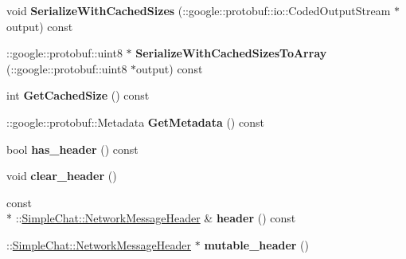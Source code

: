 \begin{DoxyCompactItemize}
\item 
\hypertarget{classSimpleChat_1_1NetworkMessage_ab6b3953b6b07078c18ea42f7c81ba957}{void {\bfseries Serialize\-With\-Cached\-Sizes} (\-::google\-::protobuf\-::io\-::\-Coded\-Output\-Stream $\ast$output) const }\label{classSimpleChat_1_1NetworkMessage_ab6b3953b6b07078c18ea42f7c81ba957}

\item 
\hypertarget{classSimpleChat_1_1NetworkMessage_afbc3848b3ae57b9ac4fcb4a1066386a7}{\-::google\-::protobuf\-::uint8 $\ast$ {\bfseries Serialize\-With\-Cached\-Sizes\-To\-Array} (\-::google\-::protobuf\-::uint8 $\ast$output) const }\label{classSimpleChat_1_1NetworkMessage_afbc3848b3ae57b9ac4fcb4a1066386a7}

\item 
\hypertarget{classSimpleChat_1_1NetworkMessage_a9da9957343256049926de81427192a3e}{int {\bfseries Get\-Cached\-Size} () const }\label{classSimpleChat_1_1NetworkMessage_a9da9957343256049926de81427192a3e}

\item 
\hypertarget{classSimpleChat_1_1NetworkMessage_a353ea5839a3f4094ff329555be0deb80}{\-::google\-::protobuf\-::\-Metadata {\bfseries Get\-Metadata} () const }\label{classSimpleChat_1_1NetworkMessage_a353ea5839a3f4094ff329555be0deb80}

\item 
\hypertarget{classSimpleChat_1_1NetworkMessage_aa690cbc56fe136ebff5f2cd7cb2d1bf3}{bool {\bfseries has\-\_\-header} () const }\label{classSimpleChat_1_1NetworkMessage_aa690cbc56fe136ebff5f2cd7cb2d1bf3}

\item 
\hypertarget{classSimpleChat_1_1NetworkMessage_a4aa5e63844f15435b24365e56dcca8bf}{void {\bfseries clear\-\_\-header} ()}\label{classSimpleChat_1_1NetworkMessage_a4aa5e63844f15435b24365e56dcca8bf}

\item 
\hypertarget{classSimpleChat_1_1NetworkMessage_a806f88019d6567da8428b3e32ddc9b80}{const \\*
\-::\hyperlink{classSimpleChat_1_1NetworkMessageHeader}{Simple\-Chat\-::\-Network\-Message\-Header} \& {\bfseries header} () const }\label{classSimpleChat_1_1NetworkMessage_a806f88019d6567da8428b3e32ddc9b80}

\item 
\hypertarget{classSimpleChat_1_1NetworkMessage_af5b511d2ddfa706a411919d5f828c19a}{\-::\hyperlink{classSimpleChat_1_1NetworkMessageHeader}{Simple\-Chat\-::\-Network\-Message\-Header} $\ast$ {\bfseries mutable\-\_\-header} ()}\label{classSimpleChat_1_1NetworkMessage_af5b511d2ddfa706a411919d5f828c19a}


\end{DoxyCompactItemize}
